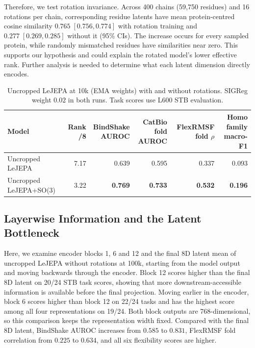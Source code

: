 Therefore, we test rotation invariance. Across 400 chains (59,750 residues) and 16 rotations per chain, corresponding residue latents have mean protein-centred cosine similarity $0.765\;[0.756,0.774]$ with rotation training and $0.277\;[0.269,0.285]$ without it (95\% CIs). The increase occurs for every sampled protein, while randomly mismatched residues have similarities near zero. This supports our hypothesis and could explain the rotated model's lower effective rank. Further analysis is needed to determine what each latent dimension directly encodes.

\begin{table}[htbp]
\centering
\resultstableformat
\fontsize{9}{10.8}\selectfont
\setlength{\tabcolsep}{4pt}
\begin{tabular}{@{}lrrrrr@{}}
\toprule
Model & Rank /8 & \shortstack{BindShake\\AUROC} & \shortstack{CatBio fold\\AUROC} & \shortstack{FlexRMSF fold\\$\rho$} & \shortstack{Homo family\\macro-F1} \\
\midrule
Uncropped LeJEPA & 7.17 & 0.639 & 0.595 & 0.337 & 0.093 \\
Uncropped LeJEPA+SO(3) & 3.22 & \textbf{0.769} & \textbf{0.733} & \textbf{0.532} & \textbf{0.196} \\
\bottomrule
\end{tabular}
\caption{Uncropped LeJEPA at 10k (EMA weights) with and without rotations. SIGReg weight $0.02$ in both runs. Task scores use L600 STB evaluation.}
\label{tab:results-rank-stb-10k}
\end{table}

\subsection{Layerwise Information and the Latent Bottleneck}
\label{sec:results-layerwise}

Here, we examine encoder blocks 1, 6 and 12 and the final 8D latent mean of uncropped LeJEPA without rotations at 100k, starting from the model output and moving backwards through the encoder. Block 12 scores higher than the final 8D latent on 20/24 STB task scores, showing that more downstream-accessible information is available before the final projection.
Moving earlier in the encoder, block 6 scores higher than block 12 on 22/24 tasks and has the highest score among all four representations on 19/24. Both block outputs are 768-dimensional, so this comparison keeps the representation width fixed. Compared with the final 8D latent, BindShake AUROC increases from $0.585$ to $0.831$, FlexRMSF fold correlation from $0.225$ to $0.634$, and all six flexibility scores are higher.

